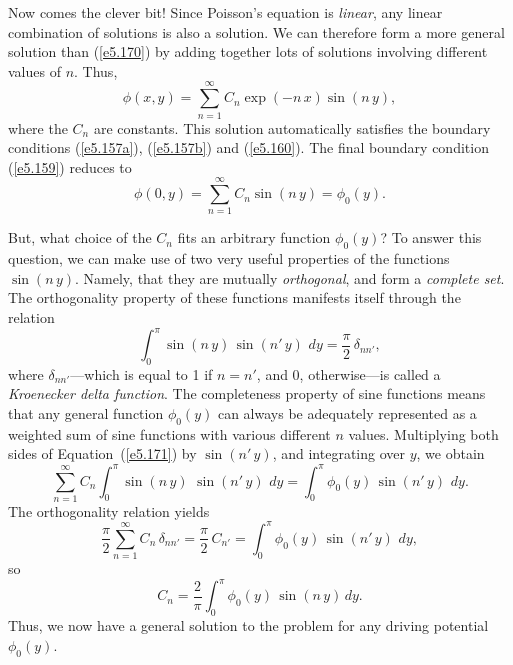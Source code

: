 Now comes the clever bit! Since Poisson's equation is {\em linear}, any
linear combination of solutions is also a solution. We can therefore form a
more general solution  than (\ref{e5.170}) by adding together lots of solutions involving
different values of $n$. Thus,
\begin{equation}
\phi(x, y) = \sum_{n=1}^\infty C_n \exp(-n\, x) \sin (n\,y),
\end{equation}
where the $C_n$ are constants. 
This solution automatically satisfies the boundary conditions (\ref{e5.157a}), (\ref{e5.157b}) and
(\ref{e5.160}).  The
final boundary condition (\ref{e5.159}) reduces to
\begin{equation}\label{e5.171}
\phi(0, y) = \sum_{n=1}^\infty C_n \sin (n\,y) = \phi_0(y).
\end{equation}

But, what choice of the $C_n$ fits an arbitrary function
$\phi_0(y)$? To answer this question, we can make use of two very useful properties
of the functions $\sin (n\,y)$. Namely, that they are mutually {\em orthogonal}, and
form a {\em complete set}. The orthogonality property of these functions manifests
itself through the relation
\begin{equation}
\int_0^\pi \sin( n\,y) \,\sin (n'\,y)\,\,dy = \frac{\pi}{2}\, \delta_{n n'},
\end{equation}
where 
$\delta_{nn'}$---which is equal to 1 if $n=n'$, and 0, otherwise---is called a {\em Kroenecker delta function}. 
The completeness property of sine functions means that any general function
$\phi_0(y)$ 
can always be adequately 
represented as a weighted sum of sine functions with various different
$n$ values. Multiplying both sides of Equation~(\ref{e5.171}) by $\sin (n'\,y)$, and integrating
over $y$, we obtain
\begin{equation}
\sum_{n=1}^\infty C_n \int_0^\pi \sin (n\,y)\,\,\sin (n'\,y)\,\,dy = 
\int_0^\pi \phi_0(y)\,\sin( n' \,y)\, \,dy.
\end{equation}
The orthogonality relation yields
\begin{equation}
\frac{\pi}{2} \sum_{n=1}^\infty C_n \,\delta_{n n'} = \frac{\pi}{2}\, C_{n'} =
\int_0^\pi \phi_0(y)\,\sin (n' \,y)\,\,dy,
\end{equation}
so
\begin{equation}
C_n = \frac{2}{\pi} \int_0^\pi \phi_0(y)\,\sin (n\,y)\,dy.
\end{equation}
Thus, we now have a general solution to the problem for any driving potential
$\phi_0(y)$. 

